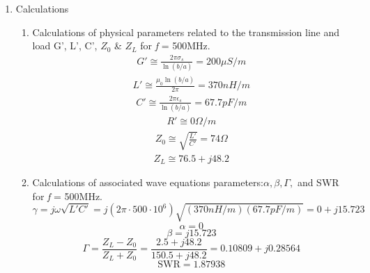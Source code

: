 \documentclass{article}
\begin{document}
\begin{enumerate}
    \item Calculations
    \begin{enumerate}
        \item  Calculations of physical parameters related to the transmission line and load G', L', C', $Z_0$ \& $Z_L$ for \textit{f} = 500MHz.
        \begin{align}
            G' \cong \frac{2\pi\sigma_s}{\ln(b/a)} = \boxed{200 \mu S/m}
        \end{align}
        \begin{align}
            L' \cong \frac{\mu_0\ln(b/a)}{2\pi}= \boxed{370 nH/m}
        \end{align}
        \begin{align}
            C' \cong \frac{2\pi\epsilon_s}{\ln(b/a)}= \boxed{67.7 pF/m}
        \end{align}
        \begin{align}
            R' \cong \boxed{0 \Omega/m}
        \end{align}
        \begin{align}
            Z_0 \cong \sqrt{\frac{L'}{C'}} = \boxed{74\Omega}
        \end{align}
        \begin{align}
            Z_L \cong \boxed{76.5+j48.2}
        \end{align}
        \item Calculations of associated wave equations parameters:$\alpha, \beta, \Gamma,$ and SWR for \textit{f} = 500MHz.
        \begin{equation}
            \gamma = j\omega\sqrt{L'C'} = j(2\pi\cdot500\cdot10^6)\sqrt{(370 nH/m)(67.7 pF/m)} = 0 + j15.723
        \end{equation}
        \begin{equation}
            \alpha = \boxed{0}
        \end{equation}
        \begin{equation}
            \beta = \boxed{j15.723}
        \end{equation}
        \begin{equation}
            \Gamma = \frac{Z_L-Z_0}{Z_L+Z_0} = \frac{2.5+j48.2}{150.5+j48.2} = \boxed{0.10809 +j0.28564}
        \end{equation}
        \begin{equation}
            \text{SWR} = \boxed{1.87938}
        \end{equation}
    \end{enumerate}

\end{enumerate}
\end{document}
